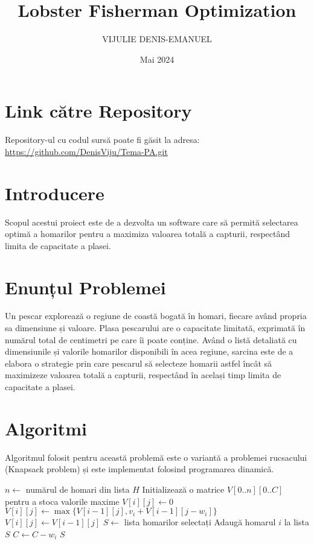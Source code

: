 \documentclass{article}
\title{Lobster Fisherman Optimization}
\author{VIJULIE DENIS-EMANUEL}
\date{Mai 2024}
\begin{document}
\maketitle

\section{Link către Repository}
Repository-ul cu codul sursă poate fi găsit la adresa:
\url{https://github.com/DenisViju/Tema-PA.git}

\section{Introducere}
Scopul acestui proiect este de a dezvolta un software care să permită selectarea optimă a homarilor pentru a maximiza valoarea totală a capturii, respectând limita de capacitate a plasei.

\section{Enunțul Problemei}
Un pescar explorează o regiune de coastă bogată în homari, fiecare având propria sa dimensiune și valoare. Plasa pescarului are o capacitate limitată, exprimată în numărul total de centimetri pe care îi poate conține. Având o listă detaliată cu dimensiunile și valorile homarilor disponibili în acea regiune, sarcina este de a elabora o strategie prin care pescarul să selecteze homarii astfel încât să maximizeze valoarea totală a capturii, respectând în același timp limita de capacitate a plasei.

\section{Algoritmi}
Algoritmul folosit pentru această problemă este o variantă a problemei rucsacului (Knapsack problem) și este implementat folosind programarea dinamică.

\begin{algorithmic}[1]
  \State $n \gets$ numărul de homari din lista $H$
  \State Initializează o matrice $V[0..n][0..C]$ pentru a stoca valorile maxime
        \State $V[i][j] \gets 0$
        \State $V[i][j] \gets \max\{V[i-1][j], v_i + V[i-1][j-w_i]\}$
      \Else
        \State $V[i][j] \gets V[i-1][j]$
      \EndIf
    \EndFor
  \EndFor
  \State $S \gets$ lista homarilor selectați
      \State Adaugă homarul $i$ la lista $S$
      \State $C \gets C - w_i$
    \EndIf
  \EndFor
  \State \Return $S$
  \EndProcedure
\end{algorithmic}
\end{document}
